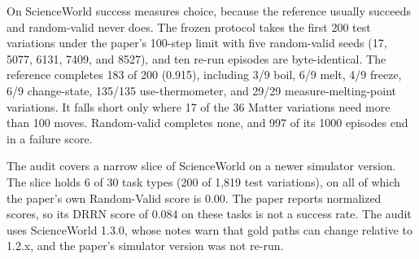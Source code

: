 On ScienceWorld success measures choice, because the reference usually succeeds and random-valid never does. The frozen protocol takes the first 200 test variations under the paper's 100-step limit with five random-valid seeds (17, 5077, 6131, 7409, and 8527), and ten re-run episodes are byte-identical. The reference completes 183 of 200 (0.915), including 3/9 boil, 6/9 melt, 4/9 freeze, 6/9 change-state, 135/135 use-thermometer, and 29/29 measure-melting-point variations. It falls short only where 17 of the 36 Matter variations need more than 100 moves. Random-valid completes none, and 997 of its 1000 episodes end in a failure score.

The audit covers a narrow slice of ScienceWorld on a newer simulator version. The slice holds 6 of 30 task types (200 of 1,819 test variations), on all of which the paper's own Random-Valid score is 0.00. The paper reports normalized scores, so its DRRN score of 0.084 on these tasks is not a success rate. The audit uses ScienceWorld 1.3.0, whose notes warn that gold paths can change relative to 1.2.x, and the paper's simulator version was not re-run.

